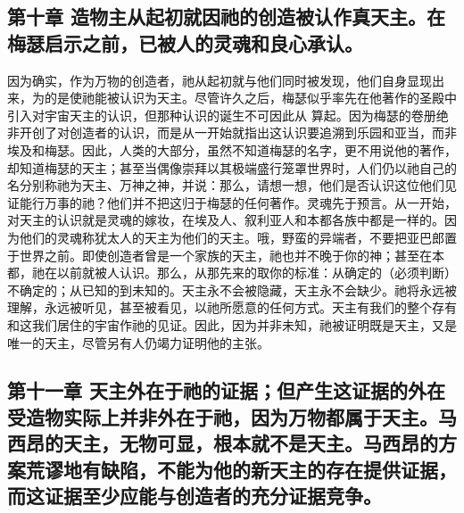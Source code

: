 
\subsection{第十章 造物主从起初就因祂的创造被认作真天主。在梅瑟启示之前，已被人的灵魂和良心承认。}

因为确实，作为万物的创造者，祂从起初就与他们同时被发现，他们自身显现出来，为的是使祂能被认识为天主。尽管许久之后，梅瑟似乎率先在他著作的圣殿中引入对宇宙天主的认识，但那种认识的诞生不可因此从  算起。因为梅瑟的卷册绝非开创了对创造者的认识，而是从一开始就指出这认识要追溯到乐园和亚当，而非埃及和梅瑟。因此，人类的大部分，虽然不知道梅瑟的名字，更不用说他的著作，却知道梅瑟的天主；甚至当偶像崇拜以其极端盛行笼罩世界时，人们仍以祂自己的名分别称祂为天主、万神之神，并说：那么，请想一想，他们是否认识这位他们见证能行万事的祂？他们并不把这归于梅瑟的任何著作。灵魂先于预言。从一开始，对天主的认识就是灵魂的嫁妆，在埃及人、叙利亚人和本都各族中都是一样的。因为他们的灵魂称犹太人的天主为他们的天主。哦，野蛮的异端者，不要把亚巴郎置于世界之前。即使创造者曾是一个家族的天主，祂也并不晚于你的神；甚至在本都，祂在以前就被人认识。那么，从那先来的取你的标准：从确定的（必须判断）不确定的；从已知的到未知的。天主永不会被隐藏，天主永不会缺少。祂将永远被理解，永远被听见，甚至被看见，以祂所愿意的任何方式。天主有我们的整个存有和这我们居住的宇宙作祂的见证。因此，因为并非未知，祂被证明既是天主，又是唯一的天主，尽管另有人仍竭力证明他的主张。\par


\subsection{第十一章 天主外在于祂的证据；但产生这证据的外在受造物实际上并非外在于祂，因为万物都属于天主。马西昂的天主，无物可显，根本就不是天主。马西昂的方案荒谬地有缺陷，不能为他的新天主的存在提供证据，而这证据至少应能与创造者的充分证据竞争。}

